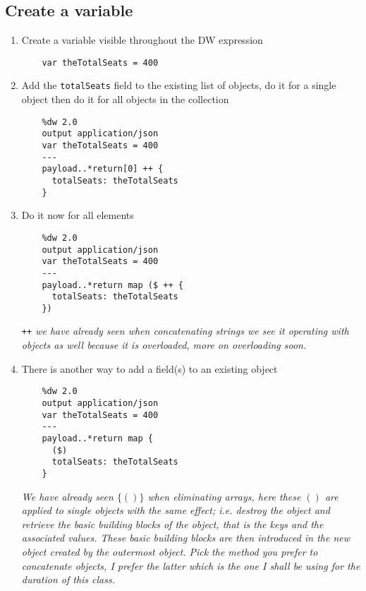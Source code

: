 \subsection{Create a variable}
\begin{enumerate}[resume*]
\item Create a variable visible throughout the DW expression
  \begin{lstlisting}
    var theTotalSeats = 400
  \end{lstlisting}
\item Add the \texttt{totalSeats} field to the existing list of objects, do it for a single object then do it for all objects in the collection
  \begin{lstlisting}
    %dw 2.0
    output application/json
    var theTotalSeats = 400
    ---
    payload..*return[0] ++ {
      totalSeats: theTotalSeats
    }
  \end{lstlisting}
\item Do it now for all elements
  \begin{lstlisting}
    %dw 2.0
    output application/json
    var theTotalSeats = 400
    ---
    payload..*return map ($ ++ {
      totalSeats: theTotalSeats
    })
  \end{lstlisting}
  \emph{
    \texttt{++} we have already seen when concatenating strings we see it operating with objects as well because it is overloaded, more on overloading soon.
  }
\item There is another way to add a field(s) to an existing object
  \begin{lstlisting}
    %dw 2.0
    output application/json
    var theTotalSeats = 400
    ---
    payload..*return map {
      ($)
      totalSeats: theTotalSeats
    }
  \end{lstlisting}
  \emph{
    We have already seen $\{()\}$ when eliminating arrays, here these $()$ are applied to single objects with the same effect; i.e. destroy the object and retrieve the basic building blocks of the object, that is the keys and the associated values.  These basic building blocks are then introduced in the new object created by the outermost object.}
  \newline
  \emph{
    Pick the method you prefer to concatenate objects, I prefer the latter which is the one I shall be using for the duration of this class.
  }
\end{enumerate}

